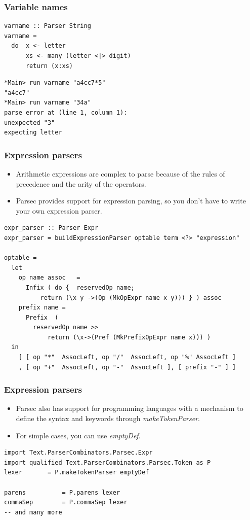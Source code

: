 \documentclass{beamer}
\begin{document}
\begin{frame}[fragile]
\frametitle{Variable names}

\begin{verbatim}
varname :: Parser String
varname =
  do  x <- letter
      xs <- many (letter <|> digit)
      return (x:xs)
\end{verbatim}

{\footnotesize
\begin{verbatim}
*Main> run varname "a4cc7*5"
"a4cc7"
*Main> run varname "34a"
parse error at (line 1, column 1):
unexpected "3"
expecting letter
\end{verbatim}
}

\end{frame}
\begin{frame}[fragile]
\frametitle{Expression parsers}
\begin{itemize}
\item Arithmetic expressions are complex to parse because of the rules of precedence and the arity of the operators.
\item Parsec provides support for expression parsing, so you don't have to write your own expression parser.
\end{itemize}

{\footnotesize
\begin{verbatim}
expr_parser :: Parser Expr
expr_parser = buildExpressionParser optable term <?> "expression"

optable =
  let
    op name assoc   = 
      Infix ( do {  reservedOp name; 
          return (\x y ->(Op (MkOpExpr name x y))) } ) assoc
    prefix name = 
      Prefix  ( 
        reservedOp name >> 
            return (\x->(Pref (MkPrefixOpExpr name x))) ) 
  in
    [ [ op "*"  AssocLeft, op "/"  AssocLeft, op "%" AssocLeft ]
    , [ op "+"  AssocLeft, op "-"  AssocLeft ], [ prefix "-" ] ]

\end{verbatim}
}

\end{frame}

\begin{frame}[fragile]
\frametitle{Expression parsers}
\begin{itemize}
\item Parsec also has support for programming languages with a mechanism to define the syntax and keywords through \emph{makeTokenParser}. 
\item For simple cases, you can use \emph{emptyDef}.
\end{itemize}

{\footnotesize
\begin{verbatim}
import Text.ParserCombinators.Parsec.Expr
import qualified Text.ParserCombinators.Parsec.Token as P
lexer       = P.makeTokenParser emptyDef    

parens          = P.parens lexer    
commaSep        = P.commaSep lexer
-- and many more 
\end{verbatim}
}

\end{frame}
\end{document}
